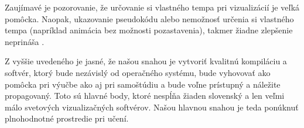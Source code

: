 Zaujímavé je pozorovanie, že určovanie si vlastného tempa pri vizualizácií 
je veľká pomôcka. Naopak, ukazovanie pseudokódu alebo nemožnosť určenia si
vlastného tempa (napríklad animácia bez možnosti pozastavenia), takmer 
žiadne zlepšenie neprináša \citep{shaffer,saraiya}.

Z vyššie uvedeného je jasné, že našou snahou je vytvoriť kvalitnú kompiláciu 
a softvér, ktorý bude nezávislý od operačného systému, bude vyhovovať ako 
pomôcka pri výučbe ako aj pri samoštúdiu a bude voľne prístupný a náležite 
propagovaný. Toto sú hlavné body, ktoré nespĺňa žiaden slovenský a 
len veľmi málo svetových vizualizačných softvérov. Našou hlavnou snahou 
je teda ponúknuť plnohodnotné prostredie pri učení.
%

